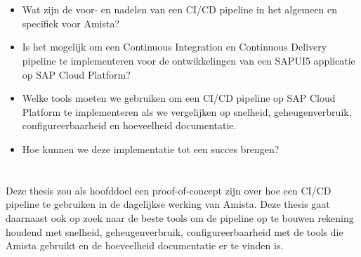 
\section{}
\label{sec:onderzoeksvraag}

\begin{itemize}
    \item Wat zijn de voor- en nadelen van een CI/CD pipeline in het algemeen en specifiek voor Amista?
    \item Is het mogelijk om een Continuous Integration en Continuous Delivery pipeline te implementeren voor de ontwikkelingen van een SAPUI5 applicatie op SAP Cloud Platform?
    \item Welke tools moeten we gebruiken om een CI/CD pipeline op SAP Cloud Platform te implementeren als we vergelijken op snelheid, geheugenverbruik, configureerbaarheid en hoeveelheid documentatie.
    \item Hoe kunnen we deze implementatie tot een succes brengen?
    
\end{itemize}

\section{}
\label{sec:onderzoeksdoelstelling}

Deze thesis zou als hoofddoel een proof-of-concept zijn over hoe een CI/CD pipeline te gebruiken in de dagelijkse werking van Amista. 
Deze thesis gaat daarnaast ook op zoek naar de beste tools om de pipeline op te bouwen rekening houdend met snelheid, geheugenverbruik, configureerbaarheid met de tools die Amista gebruikt en de hoeveelheid documentatie er te vinden is.

